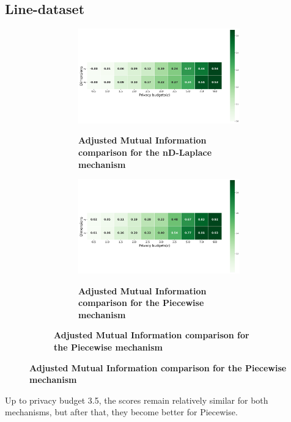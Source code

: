 {  \newpage
  \subsection{Line-dataset}
  \begin{figure}[H]
    \centering
    \begin{subfigure}[b]{0.85\textwidth}
      \begin{subfigure}[c]{1\textwidth}
        \caption{\textbf{Adjusted Mutual Information comparison for the nD-Laplace mechanism}}
        \includegraphics[width=1\textwidth]{Results/nd-laplace/nd-Laplace/line-dataset/ami.png}
        \label{fig:ami_line-dataset_comparison_kdlaplace_2d}
      \end{subfigure}
      \vfill %
      \begin{subfigure}[c]{1\textwidth}
        \caption{\textbf{Adjusted Mutual Information comparison for the Piecewise mechanism}}
        \includegraphics[width=1\textwidth]{Results/nd-laplace/piecewise/line-dataset/ami.png}
        \label{fig:ami_line-dataset_comparison_piecewise_2d}
      \end{subfigure}
    \end{subfigure}
  \end{figure}
  Up to privacy budget 3.5, the scores remain relatively similar for both mechanisms, but after that, they become better for Piecewise.

}
